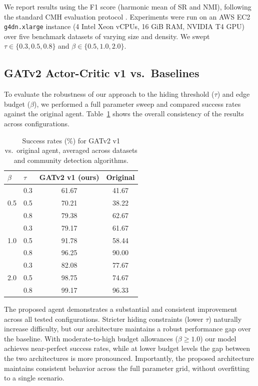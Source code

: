 \documentclass[a4paper]{article}
\begin{document}
We report results using the F1 score (harmonic mean of SR and NMI), following
the standard CMH evaluation protocol \parencite{bernini-2024}. Experiments were
run on an AWS EC2 \texttt{g4dn.xlarge} instance (4 Intel Xeon vCPUs, 16 GiB
RAM, NVIDIA T4 GPU) over five benchmark datasets of varying size and density.
We swept $\tau \in \{0.3, 0.5, 0.8\}$ and $\beta \in \{0.5, 1.0, 2.0\}$.

\subsection{GATv2 Actor-Critic v1 vs.\ Baselines}

To evaluate the robustness of our approach to the hiding threshold ($\tau$) and
edge budget ($\beta$), we performed a full parameter sweep and compared success
rates against the original agent. Table~\ref{tab:success_rate_comparison} shows
the overall consistency of the results across configurations.

\begin{table}[H]
\centering
\begin{tabular}{llcc}
\toprule
\textbf{$\beta$} & \textbf{$\tau$} & \textbf{GATv2 v1 (ours)} & \textbf{Original} \\
\midrule
\multirow{3}{*}{0.5} & 0.3 & 61.67 & 41.67 \\
                     & 0.5 & 70.21 & 38.22 \\
                     & 0.8 & 79.38 & 62.67 \\
\midrule
\multirow{3}{*}{1.0} & 0.3 & 79.17 & 61.67 \\
                     & 0.5 & 91.78 & 58.44 \\
                     & 0.8 & 96.25 & 90.00 \\
\midrule
\multirow{3}{*}{2.0} & 0.3 & 82.08 & 77.67 \\
                     & 0.5 & 98.75 & 74.67 \\
                     & 0.8 & 99.17 & 96.33 \\
\bottomrule
\end{tabular}
\caption{Success rates (\%) for GATv2 v1 vs.\ original agent, averaged
         across datasets and community detection algorithms.}
\label{tab:success_rate_comparison}
\end{table}

The proposed agent demonstrates a substantial and consistent improvement across
all tested configurations. Stricter hiding constraints (lower $\tau$) naturally
increase difficulty, but our architecture maintains a robust performance gap
over the baseline. With moderate-to-high budget allowances ($\beta \geq 1.0$)
our model achieves near-perfect success rates, while at lower budget levels
the gap between the two architectures is more pronounced. Importantly, the proposed architecture
maintains consistent behavior across the full parameter grid, without
overfitting to a single scenario.
\end{document}

